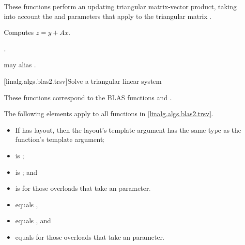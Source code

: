 \begin{itemdescr}
\pnum
These functions perform an updating triangular matrix-vector product,
taking into account the  and  parameters
that apply to the triangular matrix .

\pnum
\effects
Computes $z = y + A x$.

\pnum
\complexity
{}.

\pnum
\remarks
{} may alias .
\end{itemdescr}

[linalg.algs.blas2.trsv]{Solve a triangular linear system}

\pnum
\begin{note}
These functions correspond to the BLAS functions
 and \supercite{blas2}.
\end{note}

\pnum
The following elements apply to all functions in \ref{linalg.algs.blas2.trsv}.

\pnum
\mandates
\begin{itemize}
\item
If  has  layout,
then the layout's  template argument has
the same type as the function's  template argument;
\item
{}
is ;
\item
{}
is ; and
\item
{}
is  for those overloads that take an  parameter.
\end{itemize}

\pnum
\expects
\begin{itemize}
\item
{} equals ,
\item
{} equals , and
\item
{} equals 
for those overloads that take an  parameter.
\end{itemize}


